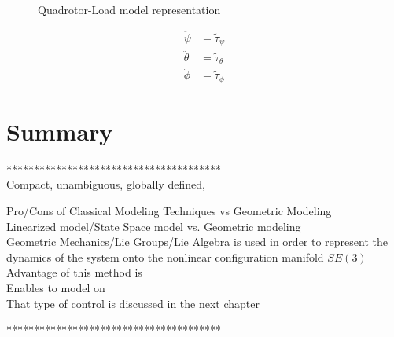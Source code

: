 \begin{figure}[h!]
	\centering
	\caption{Quadrotor-Load model representation\label{fig:QRLmodelTrad}}
\end{figure}

\begin{align}\label{key}
	\ddot{\psi}&=\tilde{\tau}_{\psi}\\
\ddot{\theta}&=\tilde{\tau}_{\theta}\\
\ddot{\phi} &=\tilde{\tau}_{\phi}
\end{align}

\section{Summary}

***************************************\\
Compact, unambiguous, globally defined, 

Pro/Cons of Classical Modeling Techniques vs Geometric Modeling\\

Linearized model/State Space model vs. Geometric modeling\\


Geometric Mechanics/Lie Groups/Lie Algebra is used in order to represent the dynamics of the system onto the nonlinear configuration manifold $ SE(3) $\\
Advantage of this method is\\
Enables to model on \\
That type of control is discussed in the next chapter


***************************************\\